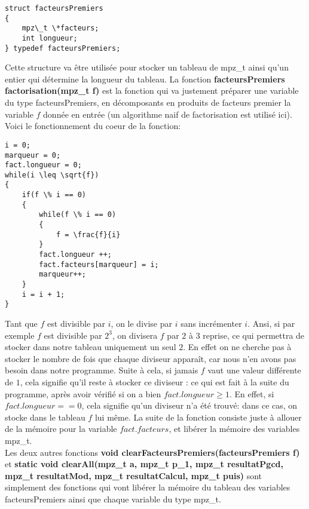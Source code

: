 \documentclass[a4paper]{article}
\begin{document}
\begin{lstlisting}
struct facteursPremiers
{
	mpz\_t \*facteurs;
	int longueur;
} typedef facteursPremiers;
\end{lstlisting}
Cette structure va être utilisée pour stocker un tableau de mpz\_t ainsi
qu'un entier qui détermine la longueur du tableau.
La fonction \textbf{facteursPremiers factorisation(mpz\_t f)} est la fonction
qui va justement préparer une variable du type facteursPremiers, en décomposants
en produits de facteurs premier la variable $f$ donnée en entrée (un algorithme
naif de factorisation est utilisé ici). Voici le fonctionnement du coeur de la fonction: 
\begin{lstlisting}
i = 0;
marqueur = 0;
fact.longueur = 0;
while(i \leq \sqrt{f})	
{
	if(f \% i == 0)	
	{
		while(f \% i == 0)
		{
			f = \frac{f}{i}
		}
		fact.longueur ++;				
		fact.facteurs[marqueur] = i;
		marqueur++;
	}
	i = i + 1;
}
\end{lstlisting}
Tant que $f$ est divisible par $i$, on le divise par $i$ sans incrémenter
$i$. Ansi, si par exemple $f$ est divisible par $2^3$, on divisera $f$ par
$2$ à $3$ reprise, ce qui permettra de stocker dans notre tableau uniquement
un seul $2$. En effet on ne cherche pas à stocker le nombre de fois que
chaque diviseur apparaît, car nous n'en avons pas besoin dans notre programme.
Suite à cela, si jamais $f$ vaut une valeur différente de $1$, cela signifie
qu'il reste à stocker ce diviseur : ce qui est fait à la suite du programme,
après avoir vérifié si on a bien $fact.longueur\geq 1$. En effet, si
$fact.longueur==0$, cela signifie qu'un diviseur n'a été trouvé: dans ce
cas, on stocke dans le tableau $f$ lui même. La suite de la fonction consiste
juste à allouer de la mémoire pour la variable $fact.facteurs$, et libérer
la mémoire des variables mpz\_t.
\\

Les deux autres fonctions \textbf{void clearFacteursPremiers(facteursPremiers f)}
et \textbf{static void clearAll(mpz\_t a, mpz\_t p\_1, mpz\_t resultatPgcd,
mpz\_t resultatMod, mpz\_t resultatCalcul, mpz\_t puis)} sont simplement des
fonctions qui vont libérer la mémoire du tableau des variables facteursPremiers
ainsi que chaque variable du type mpz\_t.
\\
\end{document}
